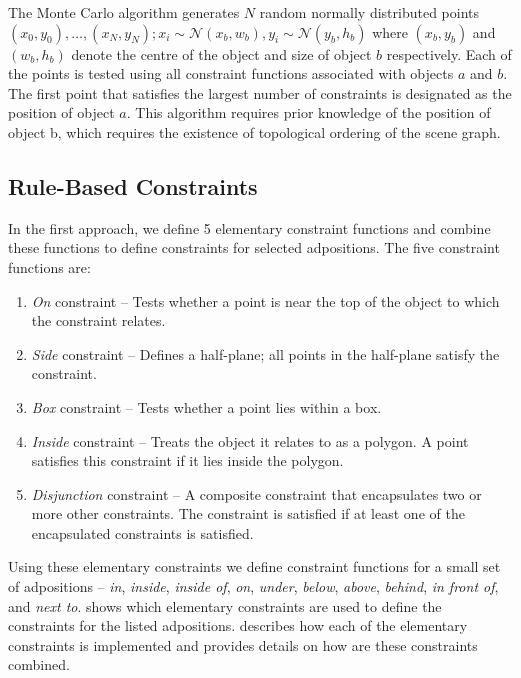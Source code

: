 \medskip

The Monte Carlo algorithm generates $N$ random normally distributed points $(x_0, y_0), \dots , (x_N, y_N); x_i \sim \mathcal{N}(x_b, w_b), y_i \sim \mathcal{N}(y_b, h_b)$ where $(x_b, y_b)$ and $(w_b, h_b)$ denote the centre of the object and size of object $b$ respectively. Each of the points is tested using all constraint functions associated with objects $a$ and $b$. The first point that satisfies the largest number of constraints is designated as the position of object $a$. This algorithm requires prior knowledge of the position of object b, which requires the existence of topological ordering of the scene graph. 

\subsection{Rule-Based Constraints}
\label{sec:rule_based_constraints}

In the first approach, we define 5 elementary constraint functions and combine these functions to define constraints for selected adpositions. The five constraint functions are:
\begin{enumerate}
    \item \emph{On} constraint -- Tests whether a point is near the top of the object to which the constraint relates. 
    \item \emph{Side} constraint -- Defines a half-plane; all points in the half-plane satisfy the constraint.
    \item \emph{Box} constraint -- Tests whether a point lies within a box.
    \item \emph{Inside} constraint -- Treats the object it relates to as a polygon. A point satisfies this constraint if it lies inside the polygon.
    \item \emph{Disjunction} constraint -- A composite constraint that encapsulates two or more other constraints. The constraint is satisfied if at least one of the encapsulated constraints is satisfied.
\end{enumerate}



Using these elementary constraints we define constraint functions for a small set of adpositions -- \emph{in}, \emph{inside}, \emph{inside of}, \emph{on}, \emph{under}, \emph{below}, \emph{above}, \emph{behind}, \emph{in front of}, and \emph{next to}.  shows which elementary constraints are used to define the constraints for the listed adpositions.  describes how each of the elementary constraints is implemented and provides details on how are these constraints combined. 

